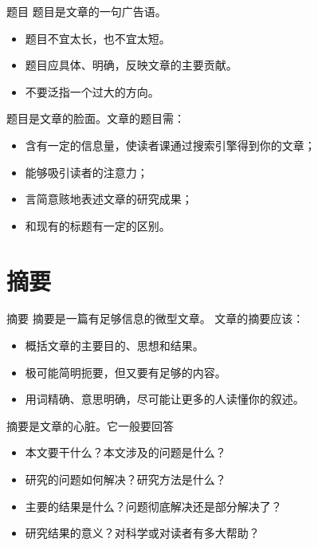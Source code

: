 \documentclass[13pt]{ctexbeamer}
\begin{document}
\begin{frame}{题目}
	题目是文章的一句广告语。
	\begin{itemize}
		\item 题目不宜太长，也不宜太短。
		\item 题目应具体、明确，反映文章的主要贡献。
		\item 不要泛指一个过大的方向。
	\end{itemize}

题目是文章的脸面。文章的题目需：
\begin{itemize}
	\item 含有一定的信息量，使读者课通过搜索引擎得到你的文章；
	\item 能够吸引读者的注意力；
	\item  言简意赅地表述文章的研究成果；
	\item 和现有的标题有一定的区别。
\end{itemize}
\end{frame}

\section{摘要}
\begin{frame}{摘要}
摘要是一篇有足够信息的微型文章。	文章的摘要应该：
	\begin{itemize}
		\item 概括文章的主要目的、思想和结果。
		\item 极可能简明扼要，但又要有足够的内容。
		\item 用词精确、意思明确，尽可能让更多的人读懂你的叙述。
	\end{itemize}

摘要是文章的心脏。它一般要回答
	\begin{itemize}
		\item 本文要干什么？本文涉及的问题是什么？
		\item 研究的问题如何解决？研究方法是什么？
		\item 主要的结果是什么？问题彻底解决还是部分解决了？
		\item 研究结果的意义？对科学或对读者有多大帮助？
	\end{itemize}

\end{frame}
\end{document}
